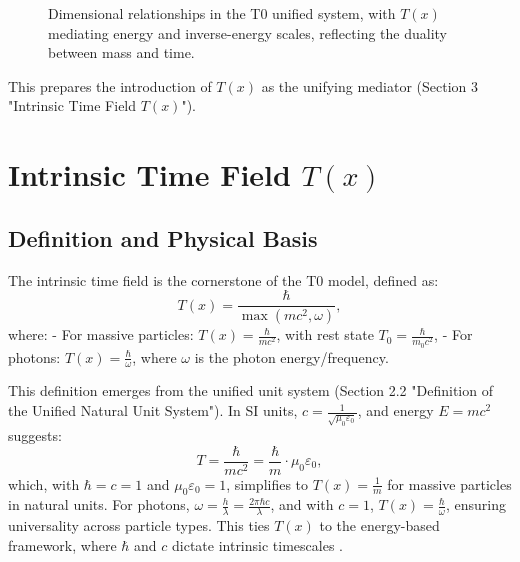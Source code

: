 \documentclass[twocolumn,aps,prl]{revtex4-2}
\newcommand{\Tfield}{T(x)}
\newcommand{\Tzero}{T_0}
\begin{document}
	\begin{figure}[ht]
		\centering
		\caption{Dimensional relationships in the T0 unified system, with \(\Tfield\) mediating energy and inverse-energy scales, reflecting the duality between mass and time.}
		\label{fig:dimensions}
	\end{figure}
	
	This prepares the introduction of \(\Tfield\) as the unifying mediator (Section 3 "Intrinsic Time Field \(\Tfield\)").
	
	\section{Intrinsic Time Field \(\Tfield\)}
	\label{sec:intrinsic_time}
	
	\subsection{Definition and Physical Basis}
	\label{subsec:time_definition}
	
	The intrinsic time field is the cornerstone of the T0 model, defined as:
	\begin{equation}
		\Tfield = \frac{\hbar}{\max(mc^2, \omega)},
		\label{eq:intrinsic_time}
	\end{equation}
	where:
	- For massive particles: \(\Tfield = \frac{\hbar}{mc^2}\), with rest state \(\Tzero = \frac{\hbar}{m_0 c^2}\),
	- For photons: \(\Tfield = \frac{\hbar}{\omega}\), where \(\omega\) is the photon energy/frequency.
	
	This definition emerges from the unified unit system (Section 2.2 "Definition of the Unified Natural Unit System"). In SI units, \(c = \frac{1}{\sqrt{\mu_0\varepsilon_0}}\), and energy \(E = mc^2\) suggests:
	\begin{equation}
		T = \frac{\hbar}{mc^2} = \frac{\hbar}{m} \cdot \mu_0\varepsilon_0,
		\label{eq:time_em}
	\end{equation}
	which, with \(\hbar = c = 1\) and \(\mu_0\varepsilon_0 = 1\), simplifies to \(\Tfield = \frac{1}{m}\) for massive particles in natural units. For photons, \(\omega = \frac{h}{\lambda} = \frac{2\pi\hbar c}{\lambda}\), and with \(c = 1\), \(\Tfield = \frac{\hbar}{\omega}\), ensuring universality across particle types. This ties \(\Tfield\) to the energy-based framework, where \(\hbar\) and \(c\) dictate intrinsic timescales \cite{pascher_lagrange_2025}.
	
\end{document}
